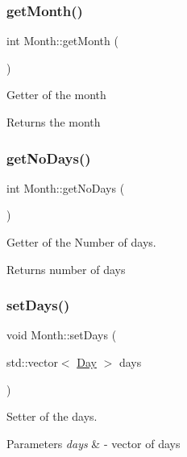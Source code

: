 \subsubsection{\texorpdfstring{get\+Month()}{getMonth()}}
{\footnotesize\ttfamily int Month\+::get\+Month (\begin{DoxyParamCaption}{ }\end{DoxyParamCaption})}

Getter of the month \begin{DoxyReturn}{Returns}
the month 
\end{DoxyReturn}
\mbox{\label{class_month_a901b9af10fe3f3dab931927c2ab77440}} 
\subsubsection{\texorpdfstring{get\+No\+Days()}{getNoDays()}}
{\footnotesize\ttfamily int Month\+::get\+No\+Days (\begin{DoxyParamCaption}{ }\end{DoxyParamCaption})}



Getter of the Number of days. 

\begin{DoxyReturn}{Returns}
number of days 
\end{DoxyReturn}
\mbox{\label{class_month_a816bb5d0a2d54283ece6924a7b54df36}} 
\subsubsection{\texorpdfstring{set\+Days()}{setDays()}}
{\footnotesize\ttfamily void Month\+::set\+Days (\begin{DoxyParamCaption}\item[{std\+::vector$<$ \mbox{\hyperlink{class_day}{Day}} $>$}]{days }\end{DoxyParamCaption})}



Setter of the days. 


\begin{DoxyParams}{Parameters}
{\em days} & -\/ vector of days \\
\hline
\end{DoxyParams}
\mbox{\label{class_month_a9f6e8f474768770ae897e53177eb1797}} 

